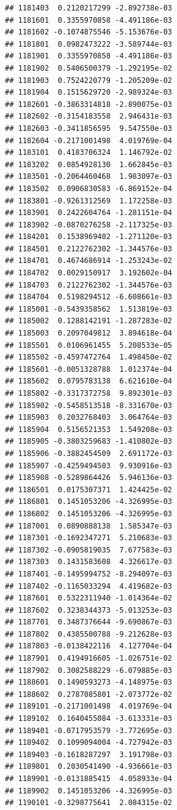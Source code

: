 \begin{frame}[fragile]
\begin{verbatim}
## 1181403  0.2120217299 -2.892738e-03
## 1181601  0.3355970858 -4.491186e-03
## 1181602 -0.1074875546 -5.153676e-03
## 1181801  0.0982473222 -3.589744e-03
## 1181901  0.3355970858 -4.491186e-03
## 1181902  0.5406500379 -1.292195e-02
## 1181903  0.7524220779 -1.205209e-02
## 1181904  0.1515629720 -2.989324e-03
## 1182601 -0.3863314818 -2.890075e-03
## 1182602 -0.3154183558  2.946431e-03
## 1182603 -0.3411856595  9.547550e-03
## 1182604 -0.2171001498  4.019769e-04
## 1183101  0.4183706324  1.146792e-02
## 1183202  0.0854928130  1.662845e-03
## 1183501 -0.2064460468  1.983097e-03
## 1183502  0.0906830583 -6.869152e-04
## 1183801 -0.9261312569  1.172258e-03
## 1183901  0.2422604764 -1.281151e-04
## 1183902 -0.0870276258 -2.117325e-03
## 1184201  0.1538969402 -1.271120e-03
## 1184501  0.2122762302 -1.344576e-03
## 1184701  0.4674686914 -1.253243e-02
## 1184702  0.0029150917  3.192602e-04
## 1184703  0.2122762302 -1.344576e-03
## 1184704  0.5198294512 -6.608661e-03
## 1185001 -0.5439358562  1.513819e-03
## 1185002  0.1288142191 -1.287283e-02
## 1185003  0.2097049812  3.894618e-04
## 1185501  0.0106961455  5.208533e-05
## 1185502 -0.4597472764  1.498450e-02
## 1185601 -0.0051328788  1.012374e-04
## 1185602  0.0795783138  6.621610e-04
## 1185802 -0.3317372758  9.892301e-03
## 1185902 -0.5458513518 -8.331670e-03
## 1185903  0.2032768403  3.064764e-03
## 1185904  0.5156521353  1.549208e-03
## 1185905 -0.3803259683 -1.410802e-03
## 1185906 -0.3882454509  2.691172e-03
## 1185907 -0.4259494503  9.930916e-03
## 1185908 -0.5289864426  5.946136e-03
## 1186501  0.0175307371  1.424425e-02
## 1186801  0.1451053206 -4.326995e-03
## 1186802  0.1451053206 -4.326995e-03
## 1187001  0.0890888138  1.585347e-03
## 1187301 -0.1692347271  5.210683e-03
## 1187302 -0.0905819035  7.677583e-03
## 1187303  0.1431583608  4.326617e-03
## 1187401 -0.1495994752 -8.294097e-03
## 1187402 -0.1165033294  4.419682e-03
## 1187601  0.5322311940 -1.014364e-02
## 1187602  0.3238344373 -5.013253e-03
## 1187701  0.3487376644 -9.690867e-03
## 1187802  0.4385500788 -9.212628e-03
## 1187803 -0.0138422116  4.127704e-04
## 1187901  0.4194916605 -1.026751e-02
## 1187902  0.3082588229 -6.079885e-03
## 1188601  0.1490593273 -4.148975e-03
## 1188602  0.2787085801 -2.073772e-02
## 1189101 -0.2171001498  4.019769e-04
## 1189102  0.1640455084 -3.613331e-03
## 1189401 -0.0717953579 -3.772695e-03
## 1189402  0.1099094004 -4.727942e-03
## 1189403 -0.1618287297  3.191798e-03
## 1189801  0.2030541490 -4.936661e-03
## 1189901 -0.0131885415  4.058933e-04
## 1189902  0.1451053206 -4.326995e-03
## 1190101 -0.3298775641  2.084315e-02

\end{verbatim}
\end{frame}
